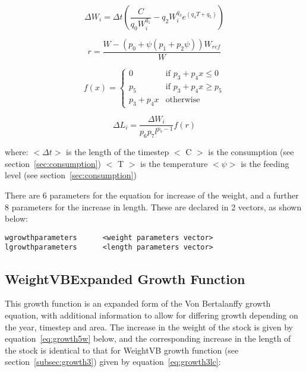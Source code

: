\documentclass[10pt,twoside]{book}
\begin{document}
\begin{equation}\label{eq:growth4w}
\Delta W_{i} = \Delta t \left( \frac{C}{q_{0} W_{i}^{q_{1}}} - q_{2} W_{i}^{q_{3}} e^{(q_{4} T + q_{5})} \right)
\end{equation}

\begin{equation}\label{eq:growth4la}
r = \frac{W - \left( p_{0} + \psi \left( p_{1} + p_{2}\psi \right) \right) W_{ref}}{W}
\end{equation}

\begin{equation}\label{eq:growth4lb}
f(x) =
\begin{cases}
0 & \textrm{if $p_{3} + p_{4}x \leq 0$} \\
p_{5} & \textrm{if $p_{3} + p_{4}x \geq p_{5}$} \\
p_{3} + p_{4}x & \textrm{otherwise}
\end{cases}
\end{equation}

\begin{equation}\label{eq:growth4lc}
\Delta L_{i} = \frac{\Delta W_{i}} {p_{6} p_{7} l^{p_{7} - 1}} f(r)
\end{equation}

where:\newline
$<\Delta t>$ is the length of the timestep\newline
$<$ C $>$ is the consumption (see section~\ref{sec:consumption})\newline
$<$ T $>$ is the temperature\newline
$<\psi>$ is the feeding level (see section~\ref{sec:consumption})

\bigskip
There are 6 parameters for the equation for increase of the weight, and a further 8 parameters for the increase in length.  These are declared in 2 vectors, as shown below:

{\small\begin{verbatim}
wgrowthparameters      <weight parameters vector>
lgrowthparameters      <length parameters vector>
\end{verbatim}}

\subsection{WeightVBExpanded Growth Function}\label{subsec:growth5}
This growth function is an expanded form of the Von Bertalanffy growth equation, with additional information to allow for differing growth depending on the year, timestep and area.  The increase in the weight of the stock is given by equation~\ref{eq:growth5w} below, and the corresponding increase in the length of the stock is identical to that for WeightVB growth function (see section~\ref{subsec:growth3}) given by equation~\ref{eq:growth3lc}:
\end{document}
